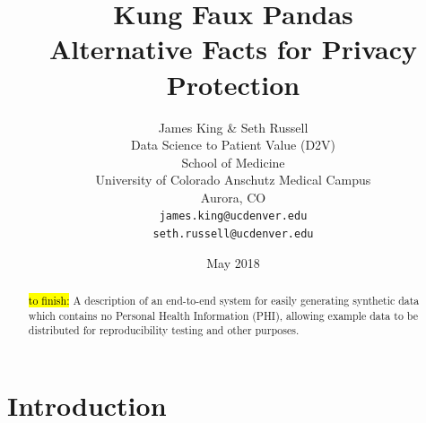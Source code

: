 \documentclass{article}
\title{%
  Kung Faux Pandas \\
  \large Alternative Facts for Privacy Protection}
\author{
  James King \& Seth Russell\\
  Data Science to Patient Value (D2V)\\
  School of Medicine \\
  University of Colorado Anschutz Medical Campus\\
  Aurora, CO\\
  \texttt{james.king@ucdenver.edu} \\
  \texttt{seth.russell@ucdenver.edu} \\
  }
\date{May 2018}
\begin{document}

\makeatletter

\newenvironment{chapquote}[2][2em]
  {\setlength{\@tempdima}{#1}%
   \def\chapquote@author{#2}%
   \parshape 1 \@tempdima \dimexpr\textwidth-2\@tempdima\relax%
   \itshape}
  {\par\normalfont\hfill--\ \chapquote@author\hspace*{\@tempdima}\par\bigskip}
\makeatother

\maketitle

\begin{abstract}
\hl{to finish:} A description of an end-to-end system for easily generating synthetic data which contains no Personal Health Information (PHI), allowing example data to be distributed for reproducibility testing and other purposes.  

\end{abstract}


\section{Introduction}


\end{document}
